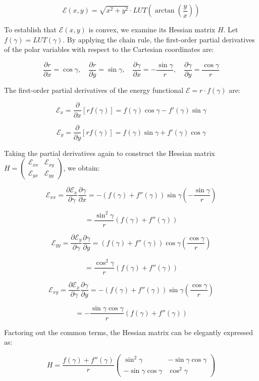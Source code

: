 $$\mathcal{E}(x,y) = \sqrt{x^2 + y^2} \cdot LUT\left(\arctan\left(\frac{y}{x}\right)\right)$$

To establish that $\mathcal{E}(x,y)$ is convex, we examine its Hessian matrix $H$.
Let $f(\gamma) = LUT(\gamma)$.
By applying the chain rule, the first-order partial derivatives of the polar variables with respect to the Cartesian coordinates are:

$$\frac{\partial r}{\partial x} = \cos\gamma, \quad \frac{\partial r}{\partial y} = \sin\gamma, \quad \frac{\partial \gamma}{\partial x} = -\frac{\sin\gamma}{r}, \quad \frac{\partial \gamma}{\partial y} = \frac{\cos\gamma}{r}$$

The first-order partial derivatives of the energy functional $\mathcal{E} = r \cdot f(\gamma)$ are:

$$\mathcal{E}_x = \frac{\partial}{\partial x}[r f(\gamma)] = f(\gamma)\cos\gamma - f'(\gamma)\sin\gamma$$

$$\mathcal{E}_y = \frac{\partial}{\partial y}[r f(\gamma)] = f(\gamma)\sin\gamma + f'(\gamma)\cos\gamma$$

Taking the partial derivatives again to construct the Hessian matrix $H = \begin{pmatrix} \mathcal{E}_{xx} & \mathcal{E}_{xy} \\ \mathcal{E}_{yx} & \mathcal{E}_{yy} \end{pmatrix}$, we obtain:

$$\mathcal{E}_{xx} = \frac{\partial \mathcal{E}_x}{\partial \gamma}\frac{\partial \gamma}{\partial x} = -(f(\gamma) + f''(\gamma))\sin\gamma \left(-\frac{\sin\gamma}{r}\right) $$

\[= \frac{\sin^2\gamma}{r}(f(\gamma) + f''(\gamma))\]

$$\mathcal{E}_{yy} = \frac{\partial \mathcal{E}_y}{\partial \gamma}\frac{\partial \gamma}{\partial y} = (f(\gamma) + f''(\gamma))\cos\gamma \left(\frac{\cos\gamma}{r}\right) $$

\[= \frac{\cos^2\gamma}{r}(f(\gamma) + f''(\gamma))\]

$$\mathcal{E}_{xy} = \frac{\partial \mathcal{E}_x}{\partial \gamma}\frac{\partial \gamma}{\partial y} = -(f(\gamma) + f''(\gamma))\sin\gamma \left(\frac{\cos\gamma}{r}\right) $$

\[= -\frac{\sin\gamma\cos\gamma}{r}(f(\gamma) + f''(\gamma))\]

Factoring out the common terms, the Hessian matrix can be elegantly expressed as:

$$H = \frac{f(\gamma) + f''(\gamma)}{r} \begin{pmatrix} \sin^2\gamma & -\sin\gamma\cos\gamma \\ -\sin\gamma\cos\gamma & \cos^2\gamma \end{pmatrix}$$

